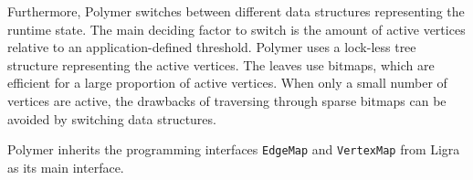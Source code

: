 Furthermore, Polymer switches between different data structures representing the runtime state. The main deciding factor to switch is the amount of active vertices relative to an application-defined threshold. Polymer uses a lock-less tree structure representing the active vertices. The leaves use bitmaps, which are efficient for a large proportion of active vertices. When only a small number of vertices are active, the drawbacks of traversing through sparse bitmaps can be avoided by switching data structures.

Polymer inherits the programming interfaces \texttt{EdgeMap} and \texttt{VertexMap} from Ligra as its main interface.
